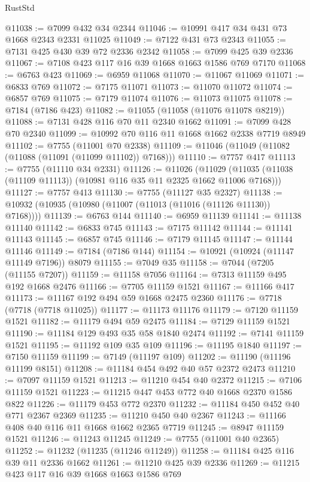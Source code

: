 \begin{lexlean}{RustStd}
\begin{coremodule}
@11038 := @7099 @432 @34 @2344
@11046 := @10991 @417 @34 @431 @73 @1668 @2343 @2331 @11025
@11049 := @7122 @431 @73 @2343
@11055 := @7131 @425 @430 @39 @72 @2336 @2342
@11058 := @7099 @425 @39 @2336
@11067 := @7108 @423 @117 @16 @39 @1668 @1663 @1586 @769 @7170
@11068 := @6763 @423
@11069 := @6959 @11068
@11070 := @11067 @11069
@11071 := @6833 @769
@11072 := @7175 @11071
@11073 := @11070 @11072
@11074 := @6857 @769
@11075 := @7179 @11074
@11076 := @11073 @11075
@11078 := @7184 (@7186 @423)
@11082 := @11055 (@11058 (@11076 @11078 @8219))
@11088 := @7131 @428 @116 @70 @11 @2340 @1662
@11091 := @7099 @428 @70 @2340
@11099 := @10992 @70 @116 @11 @1668 @1662 @2338 @7719 @8949
@11102 := @7755 (@11001 @70 @2338)
@11109 := @11046 (@11049 (@11082 (@11088 (@11091 (@11099 @11102)) @7168)))
@11110 := @7757 @417
@11113 := @7755 (@11110 @34 @2331)
@11126 := @11026
    (@11029 (@11035 (@11038 (@11109 @11113)) (@10981 @116 @35 @11 @2325 @1662 @11006 @7168)))
@11127 := @7757 @413
@11130 := @7755 (@11127 @35 @2327)
@11138 := @10932 (@10935 (@10980 (@11007 (@11013 (@11016 (@11126 @11130)) @7168))))
@11139 := @6763 @144
@11140 := @6959 @11139
@11141 := @11138 @11140
@11142 := @6833 @745
@11143 := @7175 @11142
@11144 := @11141 @11143
@11145 := @6857 @745
@11146 := @7179 @11145
@11147 := @11144 @11146
@11149 := @7184 (@7186 @144)
@11154 := @10921 (@10924 (@11147 @11149 @7196)) @8079
@11155 := @7049 @35
@11158 := @7044 (@7205 (@11155 @7207))
@11159 := @11158 @7056
@11164 := @7313 @11159 @495 @192 @1668 @2476
@11166 := @7705 @11159 @1521
@11167 := @11166 @417
@11173 := @11167 @192 @494 @59 @1668 @2475 @2360
@11176 := @7718 (@7718 (@7718 @11025))
@11177 := @11173 @11176
@11179 := @7120 @11159 @1521
@11182 := @11179 @494 @59 @2475
@11184 := @7129 @11159 @1521
@11190 := @11184 @129 @493 @35 @58 @1840 @2474
@11192 := @7141 @11159 @1521
@11195 := @11192 @109 @35 @109
@11196 := @11195 @1840
@11197 := @7150 @11159
@11199 := @7149 (@11197 @109)
@11202 := @11190 (@11196 @11199 @8151)
@11208 := @11184 @454 @492 @40 @57 @2372 @2473
@11210 := @7097 @11159 @1521
@11213 := @11210 @454 @40 @2372
@11215 := @7106 @11159 @1521
@11223 := @11215 @447 @453 @772 @40 @1668 @2370 @1586 @822
@11226 := @11179 @453 @772 @2370
@11232 := @11184 @450 @452 @40 @771 @2367 @2369
@11235 := @11210 @450 @40 @2367
@11243 := @11166 @408 @40 @116 @11 @1668 @1662 @2365 @7719
@11245 := @8947 @11159 @1521
@11246 := @11243 @11245
@11249 := @7755 (@11001 @40 @2365)
@11252 := @11232 (@11235 (@11246 @11249))
@11258 := @11184 @425 @116 @39 @11 @2336 @1662
@11261 := @11210 @425 @39 @2336
@11269 := @11215 @423 @117 @16 @39 @1668 @1663 @1586 @769

\end{coremodule}
\end{lexlean}

